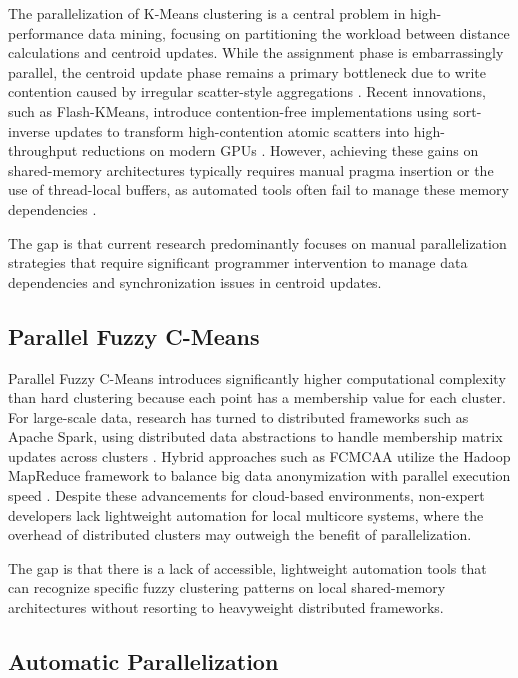\documentclass[conference,10pt]{IEEEtran}
\begin{document}
The parallelization of K-Means clustering is a central problem in high-performance data mining, focusing on partitioning the workload between distance calculations and centroid updates. While the assignment phase is embarrassingly parallel, the centroid update phase remains a primary bottleneck due to write contention caused by irregular scatter-style aggregations \cite{parallel_customer_segmentation_2025}. Recent innovations, such as Flash-KMeans, introduce contention-free implementations using sort-inverse updates to transform high-contention atomic scatters into high-throughput reductions on modern GPUs \cite{yang2026flashkmeans}. However, achieving these gains on shared-memory architectures typically requires manual pragma insertion or the use of thread-local buffers, as automated tools often fail to manage these memory dependencies \cite{parallel_customer_segmentation_2025,yang2026flashkmeans}.

The gap is that current research predominantly focuses on manual parallelization strategies that require significant programmer intervention to manage data dependencies and synchronization issues in centroid updates.

\subsection{Parallel Fuzzy C-Means}

Parallel Fuzzy C-Means introduces significantly higher computational complexity than hard clustering because each point has a membership value for each cluster. For large-scale data, research has turned to distributed frameworks such as Apache Spark, using distributed data abstractions to handle membership matrix updates across clusters \cite{spark_fuzzy_cmedian_2024}. Hybrid approaches such as FCMCAA utilize the Hadoop MapReduce framework to balance big data anonymization with parallel execution speed \cite{lawrance2024fcmcaa}. Despite these advancements for cloud-based environments, non-expert developers lack lightweight automation for local multicore systems, where the overhead of distributed clusters may outweigh the benefit of parallelization.

The gap is that there is a lack of accessible, lightweight automation tools that can recognize specific fuzzy clustering patterns on local shared-memory architectures without resorting to heavyweight distributed frameworks.

\subsection{Automatic Parallelization}
\end{document}
